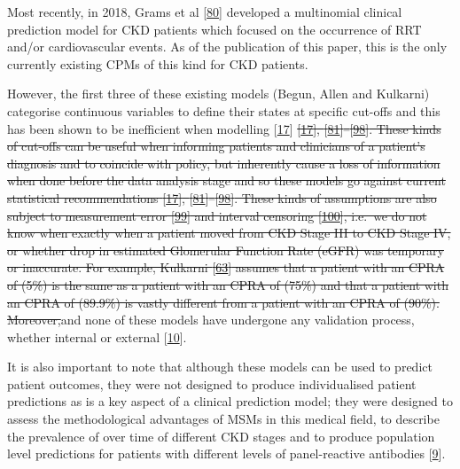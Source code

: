 \documentclass[12pt,PhD,twoside,openright]{muthesis}
\begin{document}
Most recently, in 2018, Grams et al {[}\protect\hyperlink{ref-grams_predicting_2018}{80}{]} developed a multinomial clinical prediction model for CKD patients which focused on the occurrence of RRT and/or cardiovascular events. As of the publication of this paper, this is the only currently existing CPMs of this kind for CKD patients.

However, the first three of these existing models (Begun, Allen and Kulkarni) categorise continuous variables to define their states at specific cut-offs and this has been shown to be inefficient when modelling {[}\protect\hyperlink{ref-royston_dichotomizing_2006}{17}{]} \sout{{[}\protect\hyperlink{ref-royston_dichotomizing_2006}{17}{]}, {[}\protect\hyperlink{ref-altman_problems_1994-1}{81}{]}--{[}\protect\hyperlink{ref-weinberg_how_1995}{98}{]}. These kinds of cut-offs can be useful when informing patients and clinicians of a patient's diagnosis and to coincide with policy, but inherently cause a loss of information when done before the data analysis stage and so these models go against current statistical recommendations {[}\protect\hyperlink{ref-royston_dichotomizing_2006}{17}{]}, {[}\protect\hyperlink{ref-altman_problems_1994-1}{81}{]}--{[}\protect\hyperlink{ref-weinberg_how_1995}{98}{]}. These kinds of assumptions are also subject to measurement error {[}\protect\hyperlink{ref-van_smeden_reflection_2019}{99}{]} and interval censoring {[}\protect\hyperlink{ref-sun_interval_2005}{100}{]}, i.e.~we do not know when exactly when a patient moved from CKD Stage III to CKD Stage IV, or whether drop in estimated Glomerular Function Rate (eGFR) was temporary or inaccurate. For example, Kulkarni {[}\protect\hyperlink{ref-kulkarni_transition_2017}{63}{]} assumes that a patient with an CPRA of (5\%) is the same as a patient with an CPRA of (75\%) and that a patient with an CPRA of (89.9\%) is vastly different from a patient with an CPRA of (90\%). Moreover,}and none of these models have undergone any validation process, whether internal or external {[}\protect\hyperlink{ref-altman_prognosis_2009}{10}{]}.

It is also important to note that although these models can be used to predict patient outcomes, they were not designed to produce individualised patient predictions as is a key aspect of a clinical prediction model; they were designed to assess the methodological advantages of MSMs in this medical field, to describe the prevalence of over time of different CKD stages and to produce population level predictions for patients with different levels of panel-reactive antibodies {[}\protect\hyperlink{ref-royston_prognosis_2009}{9}{]}.
\end{document}
